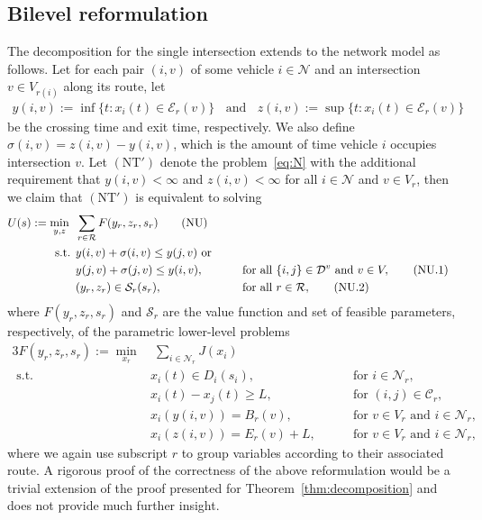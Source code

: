 \documentclass{report}
\theoremstyle{definition}
\theoremstyle{plain}
\begin{document}
\subsection{Bilevel reformulation}

The decomposition for the single intersection extends to the
network model as follows. Let for each pair $(i,v)$ of some vehicle
$i \in \mathcal{N}$ and an intersection $v \in V_{r(i)}$ along its route, let
\begin{align*}
y(i, v) := \inf \{ t: x_{i}(t) \in \mathcal{E}_{r}(v) \} \;\; \text{ and } \;\;  z(i, v) := \sup \{ t: x_{i}(t) \in \mathcal{E}_{r}(v) \}
\end{align*}
be the crossing time and exit time, respectively. We also define
$\sigma(i, v) = z(i, v) - y(i, v)$, which is the amount of time vehicle $i$ occupies
intersection $v$.
%
Let $(\mathrm{NT}')$ denote the problem~\eqref{eq:N} with the additional
requirement that $y(i,v) < \infty$ and $z(i, v) < \infty$ for all
$i \in \mathcal{N}$ and $v \in V_r$, then we claim that $(\mathrm{NT}')$ is
equivalent to solving
\begin{alignat}{3}
  U(s) := \min_{y,z} \;\; & \sum_{r \in \mathcal{R}} F(y_{r}, z_{r}, s_r) \tag{NU} \\
  \text{ s.t. } & y(i,v) + \sigma(i,v) \leq y(j,v) \text{ or } \notag \\
                & y(j,v) + \sigma(j,v) \leq y(i,v) , && \quad \text{ for all } \{i,j\} \in \mathcal{D}^{v} \text{ and } v \in V, \tag{NU.1} \\
  & (y_{r}, z_{r}) \in \mathcal{S}_{r}(s_r) , &&  \quad \text{ for all } r \in \mathcal{R} , \tag{NU.2}
\end{alignat}
%
where $F(y_{r}, z_{r}, s_r)$ and $\mathcal{S}_{r}$ are the value function and
set of feasible parameters, respectively, of the parametric lower-level problems
%
\begin{alignat}{3}
  F(y_{r}, z_{r}, s_r) := \min_{x_{r}} & \; \sum_{i \in \mathcal{N}_{r}} J(x_{i}) \tag{NL} \\
  \text{ s.t. } & x_{i}(t) \in D_{i}(s_{i}) , && \quad \text{ for } i \in \mathcal{N}_{r} , \tag{NL.1} \\
  & x_{i}(t) - x_{j}(t) \geq L , && \quad \text{ for } (i, j) \in \mathcal{C}_{r} , \tag{NL.2} \\
  & x_{i}(y(i,v)) = B_{r}(v) , && \quad \text{ for } v \in V_{r} \text{ and } i \in \mathcal{N}_{r} , \tag{NL.3} \\
  & x_{i}(z(i,v)) = E_{r}(v) + L , && \quad \text{ for } v \in V_{r} \text{ and } i \in \mathcal{N}_{r} , \tag{NL.4}
\end{alignat}
where we again use subscript $r$ to group variables according to their
associated route.
%
A rigorous proof of the correctness of the above reformulation would be a
trivial extension of the proof presented for Theorem~\ref{thm:decomposition} and does not provide
much further insight.
\end{document}
